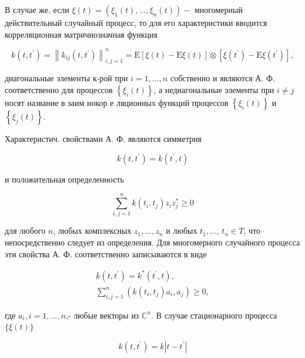 \documentclass[10pt]{article}
\begin{document}
В случае же, если $\xi(t)=\left(\xi_{1}(t), \ldots, \xi_{n}(t)\right)-$ многомерный действительный случайный процесс, то для его характеристики вводится корреляционная матричнозначная функция



\[

k\left(t, t^{\prime}\right)=\left\|k_{i j}\left(t, t^{\prime}\right)\right\|_{i, j=1}^{n}=\mathrm{E}[\xi(t)-\mathrm{E} \xi(t)] \otimes\left[\xi\left(t^{\prime}\right)-\mathrm{E} \xi\left(t^{\prime}\right)\right],

\]



диагональные элементы к-рой при $i=1, \ldots, n$ собственно и являются А. Ф. соответственно для процессов $\left\{\xi_{i}(t)\right\}$, а недиагональные элементы при $i \neq j$ носят название в заим нокор е ляционных функций процессов $\left\{\xi_{i}(t)\right\}$ и $\left\{\xi_{j}(t)\right\}$.



Характеристич. свойствами А. Ф. являются симметрия



\[

k\left(t, t^{\prime}\right)=k\left(t^{\prime}, t\right)

\]



и положительная определенность



\[

\sum_{i, j=1}^{n} k\left(t_{i}, t_{j}\right) z_{i} z_{j}^{*} \geqslant 0

\]



для любого $n$, любых комплексных $z_{1}, \ldots, z_{n}$ и любых $t_{1}, \ldots$, $t_{n} \in T$, что непосредственно следует из определения. Для многомерного случайного процесса эти свойства А. Ф. соответственно записываются в виде



\[

\begin{gathered}

k\left(t, t^{\prime}\right)=k^{*}\left(t^{\prime}, t\right), \\

\sum_{i, j=1}^{n}\left(k\left(t_{i}, t_{j}\right) a_{i}, a_{j}\right) \geqslant 0,

\end{gathered}

\]



где $a_{i}, i=1, \ldots, n$,- любые векторы из $\mathbb{C}^{n}$. В случае стационарного процесса $\{\xi(t)\}$



\[

k\left(t, t^{\prime}\right)=k\left|t-t^{\prime}\right|

\]
\end{document}

